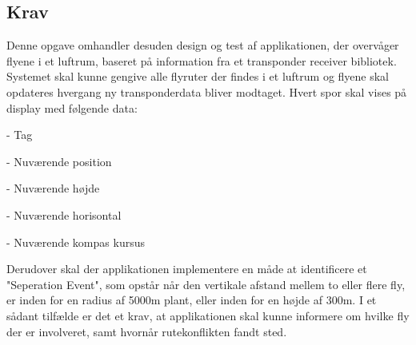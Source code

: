 \subsection{Krav}
Denne opgave omhandler desuden design og test af applikationen, der overvåger flyene i et luftrum, baseret på information fra et transponder receiver bibliotek.
Systemet skal kunne gengive alle flyruter der findes i et luftrum og flyene skal opdateres hvergang ny transponderdata bliver modtaget. Hvert spor skal vises på display med følgende data: 

- Tag

- Nuværende position

- Nuværende højde

- Nuværende horisontal

- Nuværende kompas kursus

Derudover skal der applikationen implementere en måde at identificere et "Seperation Event", som opstår når den vertikale afstand mellem to eller flere fly, er inden for en radius af 5000m plant, eller inden for en højde af 300m. 
I et sådant tilfælde er det et krav, at applikationen skal kunne informere om hvilke fly der er involveret, samt hvornår rutekonflikten fandt sted.

